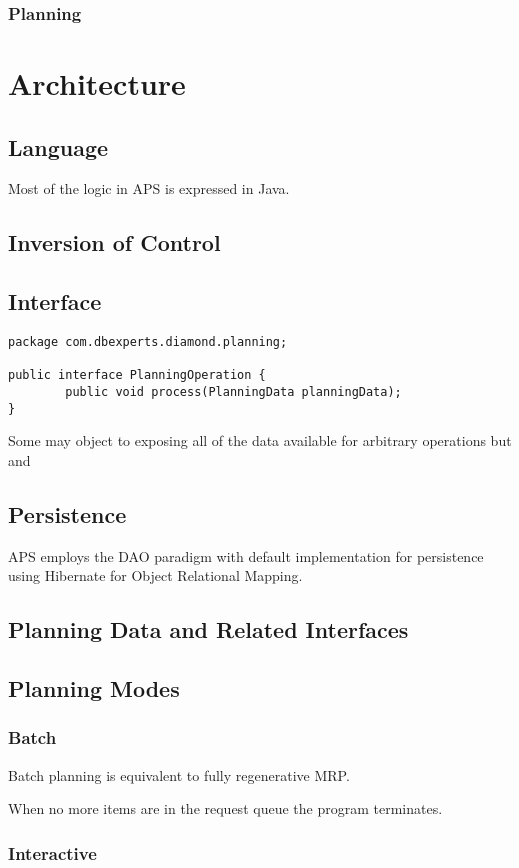 \subsection{Planning}


\chapter{Architecture}
\section{Language}
Most of the logic in APS is expressed in Java.  

\section{Inversion of Control}
\section{Interface}
\begin{verbatim}
package com.dbexperts.diamond.planning;

public interface PlanningOperation {
        public void process(PlanningData planningData);
}
\end{verbatim}
Some may object to exposing all of the data available for arbitrary operations but and 

\section{Persistence}
APS employs the DAO paradigm with default implementation for persistence using Hibernate for 
Object Relational Mapping.  
\section{Planning Data and Related Interfaces}

\section{Planning Modes}
\subsection{Batch}
Batch planning is equivalent to fully regenerative MRP.

When no more items are in the request queue the program terminates.
\subsection{Interactive}
